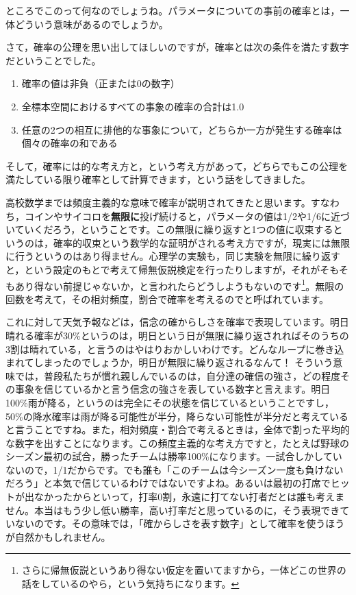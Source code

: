 \documentclass{ltjsbook}
\begin{document}
ところでこのって何なのでしょうね。パラメータについての事前の確率とは，一体どういう意味があるのでしょうか。

さて，確率の公理を思い出してほしいのですが，確率とは次の条件を満たす数字だということでした。
\begin{enumerate}
	\item 確率の値は非負（正または0の数字）
	\item 全標本空間におけるすべての事象の確率の合計は1.0
	\item 任意の2つの相互に排他的な事象について，どちらか一方が発生する確率は個々の確率の和である
\end{enumerate}
そして，確率には的な考え方と，という考え方があって，どちらでもこの公理を満たしている限り確率として計算できます，という話をしてきました。

高校数学までは頻度主義的な意味で確率が説明されてきたと思います。すなわち，コインやサイコロを\textbf{無限に}投げ続けると，パラメータの値は1/2や1/6に近づいていくだろう，ということです。この無限に繰り返すと1つの値に収束するというのは，確率的収束という数学的な証明がされる考え方ですが，現実には無限に行うというのはあり得ません。心理学の実験も，同じ実験を無限に繰り返すと，という設定のもとで考えて帰無仮説検定を行ったりしますが，それがそもそもあり得ない前提じゃないか，と言われたらどうしようもないのです\footnote{さらに帰無仮説というあり得ない仮定を置いてますから，一体どこの世界の話をしているのやら，という気持ちになります。}。無限の回数を考えて，その相対頻度，割合で確率を考えるのでと呼ばれています。

これに対して天気予報などは，信念の確からしさを確率で表現しています。明日晴れる確率が30\%というのは，明日という日が無限に繰り返されればそのうちの3割は晴れている，と言うのはやはりおかしいわけです。どんなループに巻き込まれてしまったのでしょうか，明日が無限に繰り返されるなんて！
そういう意味では，普段私たちが慣れ親しんでいるのは，自分達の確信の強さ，どの程度その事象を信じているかと言う信念の強さを表している数字と言えます。明日100\%雨が降る，というのは完全にその状態を信じているということですし，50\%の降水確率は雨が降る可能性が半分，降らない可能性が半分だと考えていると言うことですね。また，相対頻度・割合で考えるときは，全体で割った平均的な数字を出すことになります。この頻度主義的な考え方ですと，たとえば野球のシーズン最初の試合，勝ったチームは勝率100\%になります。一試合しかしていないので，1/1だからです。でも誰も「このチームは今シーズン一度も負けないだろう」と本気で信じているわけではないですよね。あるいは最初の打席でヒットが出なかったからといって，打率0割，永遠に打てない打者だとは誰も考えません。本当はもう少し低い勝率，高い打率だと思っているのに，そう表現できていないのです。その意味では，「確からしさを表す数字」として確率を使うほうが自然かもしれません。
\end{document}
